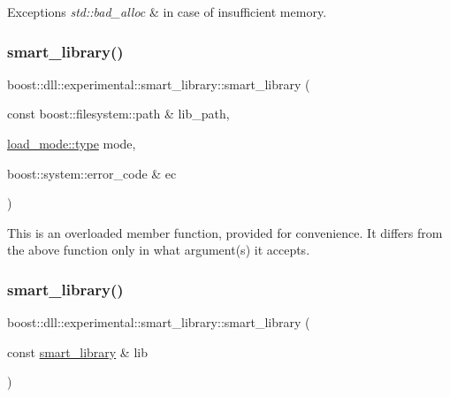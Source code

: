 \begin{DoxyExceptions}{Exceptions}
{\em std\+::bad\+\_\+alloc} & in case of insufficient memory. \\
\hline
\end{DoxyExceptions}
\mbox{\label{a01712_a941e7e08eaf01af2d6fd83f04465b4b6}} 
\subsubsection{\texorpdfstring{smart\+\_\+library()}{smart\_library()}\hspace{0.1cm}{\footnotesize\ttfamily [4/8]}}
{\footnotesize\ttfamily boost\+::dll\+::experimental\+::smart\+\_\+library\+::smart\+\_\+library (\begin{DoxyParamCaption}\item[{const boost\+::filesystem\+::path \&}]{lib\+\_\+path,  }\item[{\hyperlink{a00272_a1918a602801479bc0bade54ff5665129}{load\+\_\+mode\+::type}}]{mode,  }\item[{boost\+::system\+::error\+\_\+code \&}]{ec }\end{DoxyParamCaption})\hspace{0.3cm}{\ttfamily [inline]}}





This is an overloaded member function, provided for convenience. It differs from the above function only in what argument(s) it accepts. \mbox{\label{a01712_aba01915dd665585b9a694878a8f2d9b8}} 
\subsubsection{\texorpdfstring{smart\+\_\+library()}{smart\_library()}\hspace{0.1cm}{\footnotesize\ttfamily [5/8]}}
{\footnotesize\ttfamily boost\+::dll\+::experimental\+::smart\+\_\+library\+::smart\+\_\+library (\begin{DoxyParamCaption}\item[{const \hyperlink{a01712}{smart\+\_\+library} \&}]{lib }\end{DoxyParamCaption})\hspace{0.3cm}{\ttfamily [inline]}}

